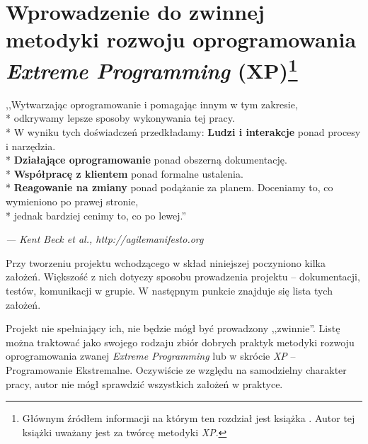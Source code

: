 \newpage

\section[Wprowadzenie do zwinnej metodyki rozwoju oprogramowania \textit{Extreme Programming} (XP)]{Wprowadzenie do zwinnej metodyki rozwoju oprogramowania \textit{Extreme Programming} (XP)\footnote{Głównym źródłem informacji na którym  ten rozdział jest książka \cite{Bec99}. Autor tej książki uważany jest za twórcę metodyki \textit{XP}.}}
\label{sec:ZMTO}

\begin{center}
    ,,Wytwarzając oprogramowanie i pomagając innym w tym zakresie,\\*
    odkrywamy lepsze sposoby wykonywania tej pracy.\\*
    W wyniku tych doświadczeń przedkładamy:\newline
    \newline
    \textbf{Ludzi i interakcje} ponad procesy i narzędzia.\\*
    \textbf{Działające oprogramowanie} ponad obszerną dokumentację.\\*
    \textbf{Współpracę z klientem} ponad formalne ustalenia.\\*
    \textbf{Reagowanie na zmiany} ponad podążanie za planem.\newline
    \newline
    Doceniamy to, co wymieniono po prawej stronie,\\*
    jednak bardziej cenimy to, co po lewej.''
\end{center}
\hfill \begin{small}\textit{--- Kent Beck et al., http://agilemanifesto.org}\end{small}

Przy tworzeniu projektu wchodzącego w skład niniejszej poczyniono kilka założeń. Większość z nich dotyczy sposobu prowadzenia projektu -- dokumentacji, testów, komunikacji w grupie. W następnym punkcie znajduje się lista tych założeń.

Projekt nie spełniający ich, nie będzie mógł być prowadzony ,,zwinnie''. Listę można traktować jako swojego rodzaju zbiór dobrych praktyk metodyki rozwoju oprogramowania zwanej \textit{Extreme Programming} lub w skrócie \textit{XP} -- Programowanie Ekstremalne. Oczywiście ze względu na samodzielny charakter pracy, autor nie mógł sprawdzić wszystkich założeń w praktyce.

